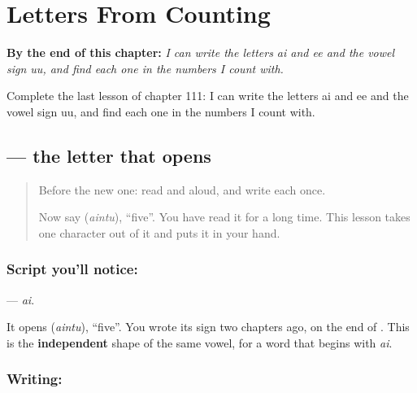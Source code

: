 
\chapter{Letters From Counting}
\label{ch:ta-letters-from-counting}

\begin{chapteropening}
\textbf{By the end of this chapter:} \emph{I can write the letters ai and ee and the vowel sign uu, and find each one in the numbers I count with.}

Complete the last lesson of chapter 111: I can write the letters ai and ee and the vowel sign uu, and find each one in the numbers I count with.
\end{chapteropening}

\section[\texorpdfstring{\ta{ஐ} (ai)}{ஐ (ai)}]{ — the letter that opens }

\label{lesson:TA-S134-letter-ai}



\begin{quote}
Before the new one: read  and  aloud, and write each once.

Now say \textbf{} (\emph{aintu}), \textquotedblleft{}five\textquotedblright{}. You have read it for a long time. This lesson takes one character out of it and puts it in your hand.
\end{quote}

\subsection*{Script you'll notice: }
\textbf{} — \emph{ai}.

It opens \textbf{} (\emph{aintu}), \textquotedblleft{}five\textquotedblright{}. You wrote its sign  two chapters ago, on the end of . This is the \textbf{independent} shape of the same vowel, for a word that begins with \emph{ai}.

\subsection*{Writing: }

